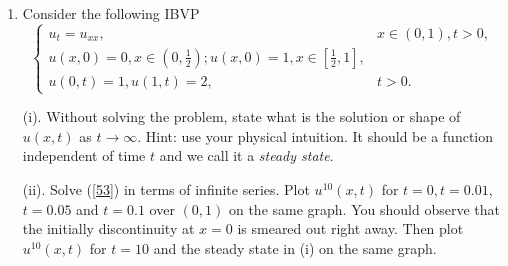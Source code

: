 \documentclass[6pt]{article}
\newtheorem{solution}{Solution}
\numberwithin{equation}{section}
\begin{document}
\begin{enumerate}
\begin{solution}
\begin{figure}[h]\vspace{-8mm}
  \centering
\texttt{[image: hw3figure5.eps]}
\caption{Evolution of approximated solutions at $t=1,2,5$ and 10.  We observe that  $u(x,t)$ in the long time ($t\geq5$) agrees well with the explicit steady state obtained in the solution.}
\end{figure}

I would like to put a few more remarks here.  As $t\rightarrow \infty$, one expects that $u(x,t)$ converges to some function which depends on $x$ but not on time $t$ (now that the limit of $t$ is taken).  This function or solution is called the stationary or steady state of the problem since it stays still.  Therefore to study the steady state of the problem, we set $u_t=0$ and collect that $u_{xx}+x-\pi=0$ in $(0\pi)$.  Solving this problem readily gives us
\[u(x)=-\frac{x^3}{6}+\frac{\pi x^2}{2}+C_1x+C_2\]
for some constants $C_i$ to be determined.  To evaluate these constants, we now apply the boundary conditions, and can find that $C_1=-(\frac{\pi^2}{3}+1)$ and $C_2=\pi$.  Note that the initial condition does not matter at all because whatever the initial data are, the eventual state would be $u(x)$ given above.  I would like to further mention that for this particular problem the steady state is quite simple since it is unique and can be explicitly obtained.  However, for general equations in particular systems of equations, the steady state does not have to be unique in general since a different initial data may lead to a different steady state.
\end{solution}

\item Consider the following IBVP
\begin{equation}\label{53}
\left\{
\begin{array}{ll}
u_t=u_{xx},& x\in(0,1),t>0,\\
u(x,0)=0, x\in(0,\frac{1}{2}); u(x,0)=1, x\in[\frac{1}{2},1],\\
u(0,t)=1, u(1,t)=2, &t>0.
\end{array}
\right.
\end{equation}

(i).  Without solving the problem, state what is the solution or shape of $u(x,t)$ as $t\rightarrow \infty$.  Hint: use your physical intuition.  It should be a function independent of time $t$ and we call it a \emph{steady state}.

(ii).  Solve (\ref{53}) in terms of infinite series.  Plot $u^{10}(x,t)$ for $t=0, t=0.01$, $t=0.05$ and $t=0.1$ over $(0,1)$ on the same graph.  You should observe that the initially discontinuity at $x=0$ is smeared out right away.  Then plot $u^{10}(x,t)$ for $t=10$ and the steady state in (i) on the same graph.


\end{enumerate}
\end{document}
